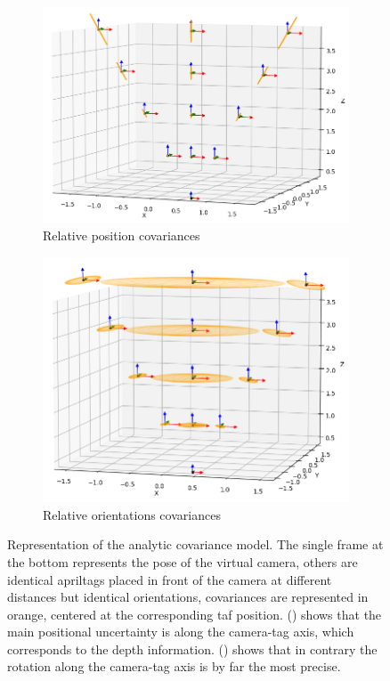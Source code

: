 \begin{figure}[h]
    \centering
    \begin{subfigure}{.49\linewidth}
        \centering
        \includegraphics[width=\textwidth]{figures/apriltag_cov_posi.png}
        \caption{Relative position covariances \label{fig:apriltag_cov_posi}}
    \end{subfigure}%
    \hfill
    \begin{subfigure}{.49\linewidth}
        \centering
        \includegraphics[width=\textwidth]{figures/apriltag_cov_orientation.png}
        \caption{Relative orientations covariances \label{fig:apriltag_cov_orientation}}
    \end{subfigure}%
    \caption{Representation of the analytic covariance model. The single frame at the bottom represents the pose of the virtual camera, others are identical 
    apriltags placed in front of the camera at different distances but identical orientations, covariances are represented in orange, centered at the corresponding taf position.
    () shows that the main positional uncertainty is along the camera-tag axis, which corresponds to the depth information. 
    () shows that in contrary the rotation along the camera-tag axis is by far the most precise.}
    \label{fig:apriltag_cov}
\end{figure}

